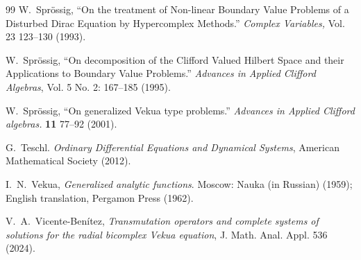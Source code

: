 \documentclass[12pt]{article}
\begin{document}
\begin{thebibliography}{99}
 W.~Spr\"{o}ssig, ``On the treatment of Non-linear Boundary Value Problems of a Disturbed Dirac Equation by Hypercomplex Methods.''  {\em Complex Variables,} Vol. 23 123--130 (1993).

 W.~Spr\"{o}ssig, ``On decomposition of the Clifford Valued Hilbert Space and their Applications to Boundary Value Problems.'' {\em Advances in Applied Clifford Algebras}, Vol. 5 No. 2: 
167--185 (1995).

 W.~Spr\"{o}ssig, ``On generalized Vekua type problems.''  {\em Advances in Applied Clifford algebras.} \textbf{11} 77--92 (2001).


 G.~Teschl. {\em Ordinary Differential Equations and Dynamical Systems}, American Mathematical Society (2012).  

 I.~N.~Vekua,  {\em Generalized analytic
    functions}.  Moscow: Nauka (in Russian) (1959); English translation, Pergamon Press (1962). %

 V.~A.~Vicente-Benítez,  \emph{Transmutation operators and complete systems of solutions for the radial bicomplex Vekua equation}, J. Math. Anal. Appl. 536 (2024).

	

\end{thebibliography}

%
%
\end{document}

